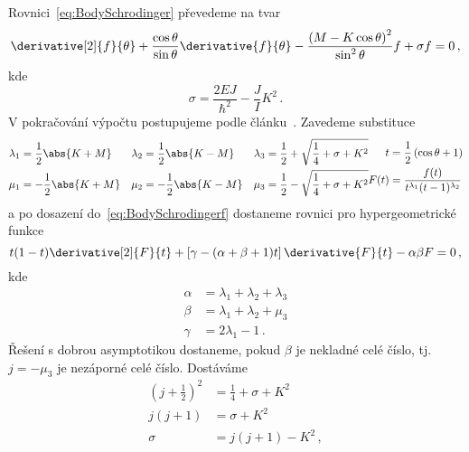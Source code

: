\begin{solution}
\begin{enumerate}
		Rovnici~\eqref{eq:BodySchrodinger} převedeme na tvar
		\begin{equation}
			\label{eq:BodySchrodingerf}
			\derivative[2]{f}{\theta}+\frac{\cos{\theta}}{\sin{\theta}}\derivative{f}{\theta}
				-\frac{\left(M-K\cos{\theta}\right)^{2}}{\sin^{2}\theta}f+\sigma f=0\,,
		\end{equation}
		kde
		\begin{equation}
			\sigma=\frac{2EJ}{\hbar^{2}}-\frac{J}{I}K^{2}\,.
		\end{equation}
		V pokračování výpočtu postupujeme podle článku~\cite{Kronig1927}.
		Zavedeme substituce
		\begin{subequations}
			\begin{align}
				\lambda_{1}&=\frac{1}{2}\abs{K+M} & 
				\lambda_{2}&=\frac{1}{2}\abs{K-M} & 
				\lambda_{3}&=\frac{1}{2}+\sqrt{\frac{1}{4}+\sigma+K^{2}}\\
				\mu_{1}&=-\frac{1}{2}\abs{K+M} & 
				\mu_{2}&=-\frac{1}{2}\abs{K-M} & 
				\mu_{3}&=\frac{1}{2}-\sqrt{\frac{1}{4}+\sigma+K^{2}}
			\end{align}
			\begin{align}
				t&=\frac{1}{2}\left(\cos{\theta}+1\right)\nonumber\\
				F(t)&=\frac{f(t)}{t^{\lambda_{1}}(t-1)^{\lambda_{2}}}
			\end{align}				
		\end{subequations}
		a po dosazení do~\eqref{eq:BodySchrodingerf} dostaneme rovnici pro hypergeometrické funkce
		\begin{equation}
			t(1-t)\derivative[2]{F}{t}+\left[\gamma-(\alpha+\beta+1)t\right]\derivative{F}{t}-\alpha\beta F=0\,,
		\end{equation}
		kde
		\begin{subequations}
			\begin{align}
				\alpha&=\lambda_{1}+\lambda_{2}+\lambda_{3}\\
				\beta&=\lambda_{1}+\lambda_{2}+\mu_{3}\\
				\gamma&=2\lambda_{1}-1\,.
			\end{align}				
		\end{subequations}
		Řešení s dobrou asymptotikou dostaneme, pokud $\beta$ je nekladné celé číslo, 
		tj. $j=-\mu_{3}$ je nezáporné celé číslo.
		Dostáváme
		\begin{align}
			\left(j+\frac{1}{2}\right)^{2}&=\frac{1}{4}+\sigma+K^{2}\nonumber\\
			j(j+1)&=\sigma+K^{2}\nonumber\\
			\sigma&=j(j+1)-K^{2}\,,\nonumber

\end{align}
\end{enumerate}
\end{solution}
